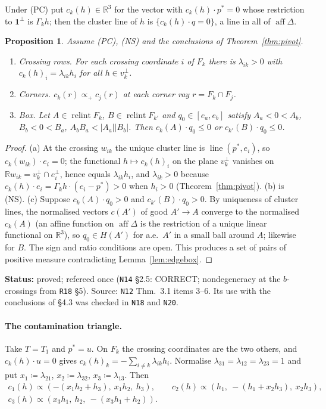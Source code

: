 \documentclass[11pt]{article}
\newtheorem{proposition}[theorem]{Proposition}
\theoremstyle{definition}
\theoremstyle{remark}
\newcommand{\R}{\mathbb R}
\newcommand{\one}{\mathbf 1}
\newcommand{\relint}{\operatorname{relint}}
\newcommand{\aff}{\operatorname{aff}}
\newcommand{\lin}{\operatorname{line}}
\newcommand{\src}[1]{\texttt{#1}}
\newcommand{\status}[1]{\par\smallskip\noindent\textbf{Status:} #1\par\smallskip}
\begin{document}
Under (PC) put $c_k(h)\in\R^3$ for the vector with $c_k(h)\cdot p^*=0$ whose restriction to $\one^\perp$ is $\Gamma_kh$; then the cluster line of $h$ is $\{c_k(h)\cdot q=0\}$, a line in all of $\aff\Delta$.

\begin{proposition}\label{prop:boxbridge}
Assume (PC), (NS) and the conclusions of Theorem~\ref{thm:pivot}.
\begin{enumerate}[leftmargin=*,label=(\alph*)]
\item \emph{Crossing rows.} For each crossing coordinate $i$ of $F_k$ there is $\lambda_{ik}>0$ with $c_k(h)_i=\lambda_{ik}h_i$ for all $h\in v_k^\perp$.
\item \emph{Corners.} $c_k(r)\propto_+c_j(r)$ at each corner ray $r=F_k\cap F_j$.
\item \emph{Box.} Let $A\in\relint F_k$, $B\in\relint F_{k'}$ and $q_0\in[e_a,e_b]$ satisfy $A_a<0<A_b$, $B_b<0<B_a$, $A_bB_a<|A_a||B_b|$. Then $c_k(A)\cdot q_0\le0$ or $c_{k'}(B)\cdot q_0\le0$.
\end{enumerate}
\end{proposition}
\begin{proof}
(a) At the crossing $w_{ik}$ the unique cluster line is $\lin(p^*,e_i)$, so $c_k(w_{ik})\cdot e_i=0$; the functional $h\mapsto c_k(h)_i$ on the plane $v_k^\perp$ vanishes on $\R w_{ik}=v_k^\perp\cap e_i^\perp$, hence equals $\lambda_{ik}h_i$, and $\lambda_{ik}>0$ because $c_k(h)\cdot e_i=\Gamma_kh\cdot(e_i-p^*)>0$ when $h_i>0$ (Theorem~\ref{thm:pivot}). (b) is (NS). (c) Suppose $c_k(A)\cdot q_0>0$ and $c_{k'}(B)\cdot q_0>0$. By uniqueness of cluster lines, the normalised vectors $c(A')$ of good $A'\to A$ converge to the normalised $c_k(A)$ (an affine function on $\aff\Delta$ is the restriction of a unique linear functional on $\R^3$), so $q_0\in H(A')$ for a.e.\ $A'$ in a small ball around $A$; likewise for $B$. The sign and ratio conditions are open. This produces a set of pairs of positive measure contradicting Lemma~\ref{lem:edgebox}.
\end{proof}
\status{proved; refereed once (\src{N14} \S2.5: CORRECT; nondegeneracy at the $b$-crossings from \src{R18} \S5). Source: \src{N12} Thm.~3.1 items 3--6. Its use with the conclusions of \S4.3 was checked in \src{N18} and \src{N20}.}

\paragraph{The contamination triangle.}
Take $T=T_1$ and $p^*=u$. On $F_k$ the crossing coordinates are the two others, and $c_k(h)\cdot u=0$ gives $c_k(h)_k=-\sum_{i\ne k}\lambda_{ik}h_i$. Normalise $\lambda_{31}=\lambda_{12}=\lambda_{23}=1$ and put $x_1\coloneqq\lambda_{21}$, $x_2\coloneqq\lambda_{32}$, $x_3\coloneqq\lambda_{13}$. Then
\begin{gather*}
c_1(h)\propto(-(x_1h_2+h_3),\ x_1h_2,\ h_3),\qquad
c_2(h)\propto(h_1,\ -(h_1+x_2h_3),\ x_2h_3),\\
c_3(h)\propto(x_3h_1,\ h_2,\ -(x_3h_1+h_2)).
\end{gather*}
\end{document}
